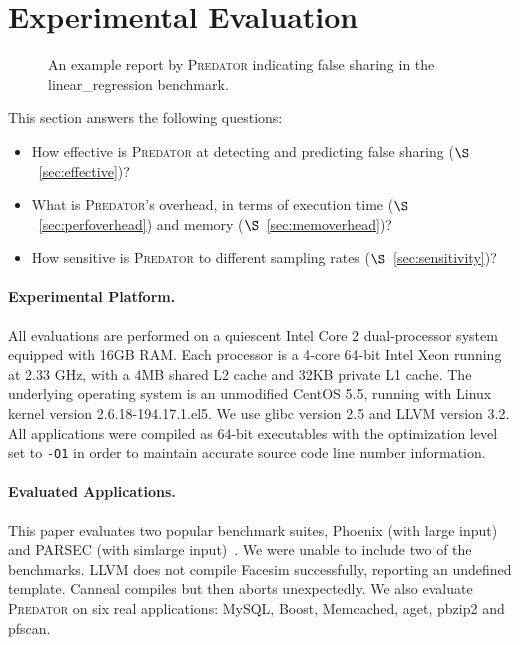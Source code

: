 \documentclass[10pt]{sigplanconf}
\newcommand{\Predator}{{\scshape Predator}}
\begin{document}
\section{Experimental Evaluation}
\begin{figure}[htb]
{\centering
\tiny
\subfigure{}
\caption{An example report by \Predator{} indicating false sharing in the linear\_regression benchmark.
\label{fig:lrreport}}
}
\end{figure}


\label{sec:evaluation}

This section answers the following questions:
\begin{itemize}
\item
How effective is \Predator{} at detecting and predicting false sharing ($\S$~\ref{sec:effective})?

\item
What is \Predator{}'s overhead, in terms of execution time ($\S$~\ref{sec:perfoverhead}) and memory ($\S$~\ref{sec:memoverhead})?

\item 
How sensitive is \Predator{} to different sampling rates ($\S$~\ref{sec:sensitivity})? 

\end{itemize}


\paragraph{Experimental Platform.} All evaluations are performed on a quiescent Intel Core 2 dual-processor system equipped with 
16GB RAM. Each processor is a 4-core 64-bit Intel Xeon running at 2.33 GHz, with a 4MB shared L2 cache and 32KB private L1 cache. The underlying operating system is an unmodified CentOS 5.5, running with Linux kernel version 2.6.18-194.17.1.el5. We use glibc version 2.5 and LLVM version 3.2. 
All applications were compiled as 64-bit executables with the optimization level set to \texttt{-O1} in order to maintain accurate source code line number information.

\paragraph{Evaluated Applications.} 
This paper evaluates two popular benchmark suites,
Phoenix (with large input)~\cite{phoenix-hpca} and PARSEC (with simlarge input)~\cite{parsec}. We were unable to include two of the benchmarks. LLVM does not compile Facesim successfully, reporting an undefined template. Canneal compiles but then aborts unexpectedly. We also evaluate \Predator{} on six real applications: MySQL, Boost, Memcached, aget, pbzip2 and pfscan.
\end{document}
